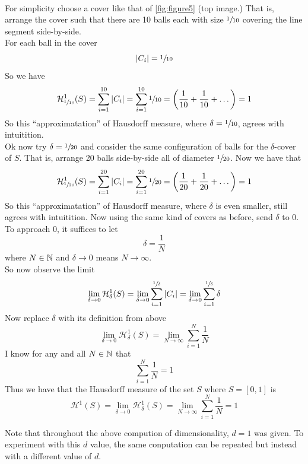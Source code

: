 \documentclass[11pt]{ekblite}
\begin{document}
\begin{example}
\begin{figure}[h]
	\end{figure}
	\\[0.2in]For simplicity choose a cover like that of \ref{fig:figure5} (top image.) That is, arrange the cover such that there are 10 balls each with size $\sfrac{1}{10}$ covering the line segment side-by-side.
	\\[0.2in]For each ball in the cover
	\[|C_i| = \sfrac{1}{10}\]
	So we have
	\[\mathcal{H}_{\sfrac{1}{10}}^{1} (S) = \sum_{i=1}^{10} |C_i| = \sum_{i=1}^{10} \sfrac{1}{10} = \left( \frac{1}{10} + \frac{1}{10} + \dots \right) = 1\]
	So this ``approximatation'' of Hausdorff measure, where $\delta = \sfrac{1}{10}$, agrees with intuitition.
	\\[0.2in]Ok now try $\delta = \sfrac{1}{20}$ and consider the same configuration of balls for the $\delta$-cover of $S$. That is, arrange 20 balls side-by-side all of diameter $\sfrac{1}{20}$. Now we have that
	\[\mathcal{H}_{\sfrac{1}{20}}^{1} (S) = \sum_{i=1}^{20} |C_i| = \sum_{i=1}^{20} \sfrac{1}{20} = \left( \frac{1}{20} + \frac{1}{20} + \dots \right) = 1\]
	So this ``approximatation'' of Hausdorff measure, where $\delta$ is even smaller, still agrees with intuitition.
	Now using the same kind of covers as before, send $\delta$ to 0. To approach 0, it suffices to let
	\[\delta = \frac{1}{N}\]
	where $N \in \mathbb{N}$ and $\delta \rightarrow 0$ means $N \rightarrow \infty$.
	\\[0.2in]So now observe the limit
	\[\lim_{\delta \rightarrow 0} \mathcal{H}_{\delta}^{1} (S) = \lim_{\delta \rightarrow 0} \sum_{i=1}^{\sfrac{1}{\delta}} |C_i| = \lim_{\delta \rightarrow 0} \sum_{i=1}^{\sfrac{1}{\delta}} \delta\]
	Now replace $\delta$ with its definition from above 
	\[\lim_{\delta \rightarrow 0} \mathcal{H}_{\delta}^{1} (S) = \lim_{N \rightarrow \infty} \sum_{i=1}^{N} \frac{1}{N}\]
	I know for any and all $N \in \mathbb{N}$ that
	\[\sum_{i=1}^{N} \frac{1}{N} = 1\]
	Thus we have that the Hausdorff measure of the set $S$ where $S = [0,1]$ is
	\[\mathcal{H}^1 (S) = \lim_{\delta \rightarrow 0} \mathcal{H}_{\delta}^{1} (S) = \lim_{N \rightarrow \infty} \sum_{i=1}^{N} \frac{1}{N} = 1\]
\end{example}
Note that throughout the above compution of dimensionality, $d=1$ was given. To experiment with this $d$ value, the same conputation can be repeated but instead with a different value of $d$.
\end{document}
